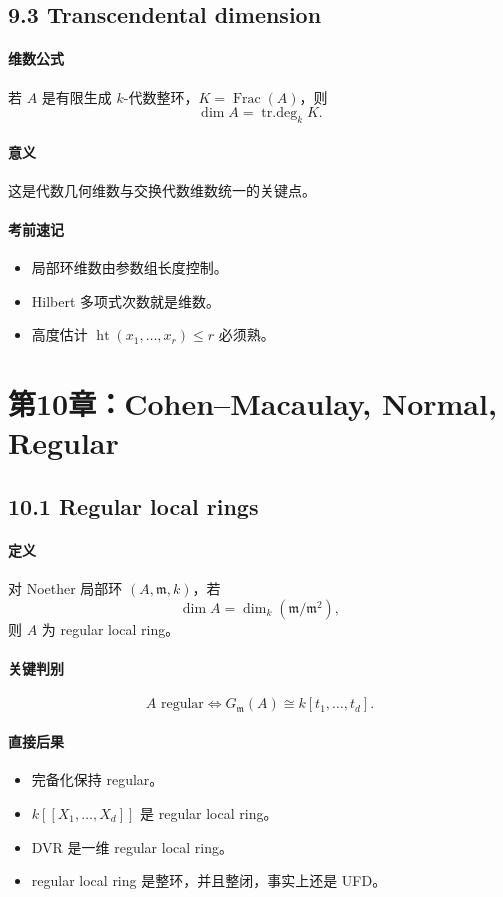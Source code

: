 \documentclass[a4paper]{ctexart}
\begin{document}
\subsection{9.3 Transcendental dimension}

\paragraph{维数公式}
若 \(A\) 是有限生成 \(k\)-代数整环，\(K=\operatorname{Frac}(A)\)，则
\[
\dim A=\operatorname{tr.deg}_k K.
\]

\paragraph{意义}
这是代数几何维数与交换代数维数统一的关键点。

\paragraph{考前速记}
\begin{itemize}
  \item 局部环维数由参数组长度控制。
  \item Hilbert 多项式次数就是维数。
  \item 高度估计 \(\operatorname{ht}(x_1,\dots,x_r)\le r\) 必须熟。
\end{itemize}

\section{第10章：Cohen--Macaulay, Normal, Regular}

\subsection{10.1 Regular local rings}

\paragraph{定义}
对 Noether 局部环 \((A,\mathfrak m,k)\)，若
\[
\dim A=\dim_k(\mathfrak m/\mathfrak m^2),
\]
则 \(A\) 为 regular local ring。

\paragraph{关键判别}
\[
A \text{ regular}
\Longleftrightarrow
G_{\mathfrak m}(A)\cong k[t_1,\dots,t_d].
\]

\paragraph{直接后果}
\begin{itemize}
  \item 完备化保持 regular。
  \item \(k[[X_1,\dots,X_d]]\) 是 regular local ring。
  \item DVR 是一维 regular local ring。
  \item regular local ring 是整环，并且整闭，事实上还是 UFD。
\end{itemize}
\end{document}
